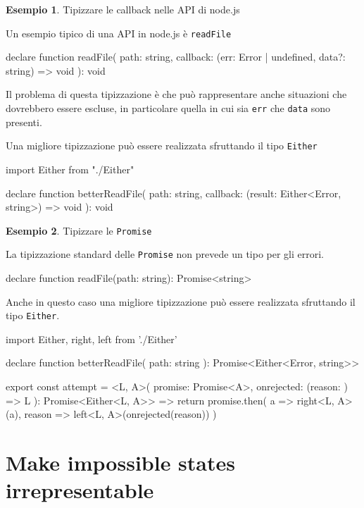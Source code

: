 \documentclass[12pt]{article}
\theoremstyle{definition}
\newtheorem{example}{Esempio}[subsection]
\newenvironment{code}
  {\vspace{0.5cm} \VerbatimEnvironment\begin{typescriptcode}}
  {\end{typescriptcode} \vspace{0.2cm}}
\begin{document}
\begin{example}
Tipizzare le callback nelle API di node.js

Un esempio tipico di una API in node.js è \texttt{readFile}

\begin{code}
declare function readFile(
  path: string,
  callback: (err: Error | undefined, data?: string) => void
): void
\end{code}

Il problema di questa tipizzazione è che può rappresentare anche situazioni che dovrebbero essere escluse, in particolare
quella in cui sia \texttt{err} che \texttt{data} sono presenti.

Una migliore tipizzazione può essere realizzata sfruttando il tipo \texttt{Either}

\begin{code}
import { Either } from "./Either"

declare function betterReadFile(
  path: string,
  callback: (result: Either<Error, string>) => void
): void
\end{code}
\end{example}

\begin{example}
Tipizzare le \texttt{Promise}

La tipizzazione standard delle \texttt{Promise} non prevede un tipo per gli errori.

\begin{code}
declare function readFile(path: string): Promise<string>
\end{code}

Anche in questo caso una migliore tipizzazione può essere realizzata sfruttando il tipo \texttt{Either}.

\begin{code}
import { Either, right, left } from './Either'

declare function betterReadFile(
  path: string
): Promise<Either<Error, string>>

export const attempt = <L, A>(
  promise: Promise<A>,
  onrejected: (reason: {}) => L
): Promise<Either<L, A>> => {
  return promise.then(
    a => right<L, A>(a),
    reason => left<L, A>(onrejected(reason))
  )
}
\end{code}
\end{example}

\newpage
\section{Make impossible states irrepresentable}
\end{document}
